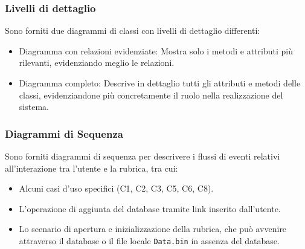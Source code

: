 \subsubsection{Livelli di dettaglio}
Sono forniti due diagrammi di classi con livelli di dettaglio differenti:
\begin{itemize}[noitemsep, topsep=5pt]
	\item Diagramma con relazioni evidenziate: Mostra solo i metodi e attributi più rilevanti, evidenziando meglio le relazioni.
	\item Diagramma completo: Descrive in dettaglio tutti gli attributi e metodi delle classi, evidenziandone più concretamente il ruolo nella realizzazione del sistema.
\end{itemize}

\subsubsection{Diagrammi di Sequenza}
Sono forniti diagrammi di sequenza per descrivere i flussi di eventi relativi all’interazione tra l’utente e la rubrica, tra cui:
\begin{itemize}[noitemsep, topsep=5pt]
	\item Alcuni casi d’uso specifici (C1, C2, C3, C5, C6, C8).
	\item L’operazione di aggiunta del database tramite link inserito dall’utente.
	\item Lo scenario di apertura e inizializzazione della rubrica, che può avvenire attraverso il database o il file locale \texttt{Data.bin} in assenza del database.
\end{itemize}